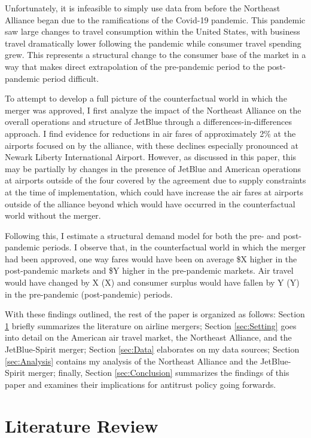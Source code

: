 \documentclass{article}
\begin{document}
	Unfortunately, it is infeasible to simply use data from before the Northeast Alliance began due to the ramifications of the Covid-19 pandemic. This pandemic saw large changes to travel consumption within the United States, with business travel dramatically lower following the pandemic while consumer travel spending grew. This represents a structural change to the consumer base of the market in a way that makes direct extrapolation of the pre-pandemic period to the post-pandemic period difficult.
	
	To attempt to develop a full picture of the counterfactual world in which the merger was approved, I first analyze the impact of the Northeast Alliance on the overall operations and structure of JetBlue through a differences-in-differences approach. I find evidence for reductions in air fares of approximately 2\% at the airports focused on by the alliance, with these declines especially pronounced at Newark Liberty International Airport. However, as discussed in this paper, this may be partially by changes in the presence of JetBlue and American operations at airports outside of the four covered by the agreement due to supply constraints at the time of implementation, which could have increase the air fares at airports outside of the alliance beyond which would have occurred in the counterfactual world without the merger. 
	
	Following this, I estimate a structural demand model for both the pre- and post-pandemic periods. I observe that, in the counterfactual world in which the merger had been approved, one way fares would have been on average \$X higher in the post-pandemic markets and \$Y higher in the pre-pandemic markets. Air travel would have changed by {X} (X) and consumer surplus would have fallen by {Y} (Y) in the pre-pandemic (post-pandemic) periods. 

	With these findings outlined, the rest of the paper is organized as follows: Section \ref{sec:Literature} briefly summarizes the literature on airline mergers; Section \ref{sec:Setting} goes into detail on the American air travel market, the Northeast Alliance, and the JetBlue-Spirit merger; Section \ref{sec:Data} elaborates on my data sources; Section \ref{sec:Analysis} contains my analysis of the Northeast Alliance and the JetBlue-Spirit merger; finally, Section \ref{sec:Conclusion} summarizes the findings of this paper and examines their implications for antitrust policy going forwards. 
  
	\section{Literature Review}
	\label{sec:Literature}
	
\end{document}
